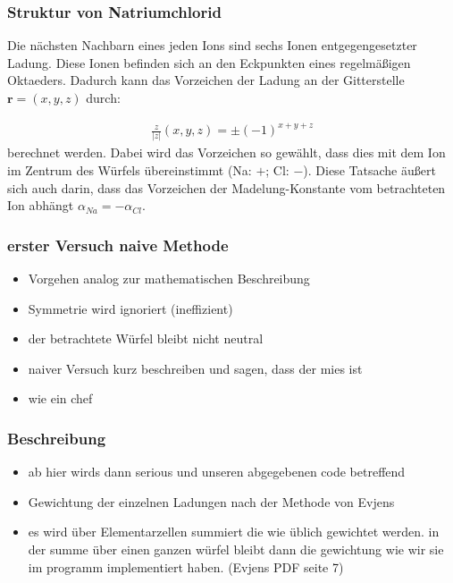 \documentclass[10pt,a4paper]{article}
\begin{document}
\subsubsection{Struktur von Natriumchlorid}

Die nächsten Nachbarn eines jeden Ions sind sechs Ionen entgegengesetzter Ladung. Diese Ionen befinden sich an den Eckpunkten eines regelmäßigen Oktaeders. Dadurch kann das Vorzeichen der Ladung an der Gitterstelle $\mathbf{r} = \left( x,y,z \right)$ durch:

\begin{align}
\frac{z}{|z|}(x,y,z) = \pm \left( -1 \right)^{x+y+z}
\end{align}
berechnet werden. Dabei wird das Vorzeichen so gewählt, dass dies mit dem Ion im Zentrum des Würfels übereinstimmt (Na: $+$; Cl: $-$). Diese Tatsache äußert sich auch darin, dass das Vorzeichen der Madelung-Konstante vom betrachteten Ion abhängt $\alpha_{Na} = - \alpha_{Cl}$.
\subsubsection{erster Versuch naive Methode}

\begin{itemize}
\item Vorgehen analog zur mathematischen Beschreibung
\item Symmetrie wird ignoriert (ineffizient)
\item der betrachtete Würfel bleibt nicht neutral
\item naiver Versuch kurz beschreiben und sagen, dass der mies ist
\item wie ein chef
\end{itemize}

\subsubsection{Beschreibung}

\begin{itemize}
\item ab hier wirds dann serious und unseren abgegebenen code betreffend
\item Gewichtung der einzelnen Ladungen nach der Methode von Evjens\cite{Evjen}
\item es wird über Elementarzellen summiert die wie üblich gewichtet werden. in der summe über einen ganzen würfel bleibt dann die gewichtung wie wir sie im programm implementiert haben. (Evjens PDF seite 7)
\end{itemize}
\end{document}
